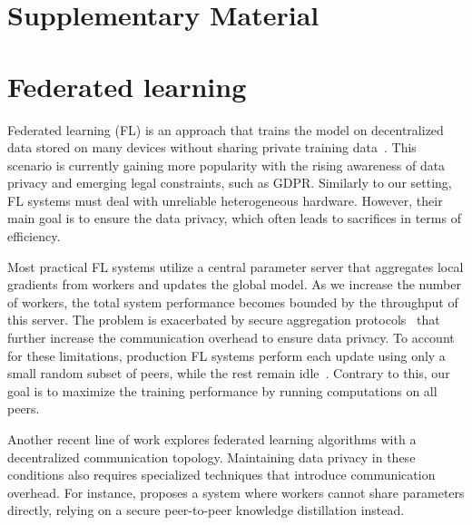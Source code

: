 \section*{Supplementary Material}

\section{Federated learning}
\label{appendix:related_federated}

Federated learning (FL) is an approach that trains the model on decentralized data stored on many devices without sharing private training data~\cite{FedLearningOriginal}. This scenario is currently gaining more popularity with the rising awareness of data privacy and emerging legal constraints, such as GDPR. Similarly to our setting, FL systems must deal with unreliable heterogeneous hardware. However, their main goal is to ensure the data privacy, which often leads to sacrifices in terms of efficiency.

Most practical FL systems utilize a central parameter server that aggregates local gradients from workers and updates the global model.
As we increase the number of workers, the total system performance becomes bounded by the throughput of this server.
The problem is exacerbated by secure aggregation protocols~\cite{PracticalSecureAggregation, FedLearningDiffPrivacy} that further increase the communication overhead to ensure data privacy.
To account for these limitations, production FL systems perform each update using only a small random subset of peers, while the rest remain idle~\cite{FedLearningAtScale}. Contrary to this, our goal is to maximize the training performance by running computations on all peers.

Another recent line of work explores federated learning algorithms with a decentralized communication topology. %
Maintaining data privacy in these conditions also requires specialized techniques that introduce communication overhead. For instance, \cite{FedLearningDecentralized} proposes a system where workers cannot share parameters directly, relying on a secure peer-to-peer knowledge distillation instead. %


